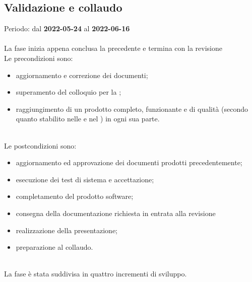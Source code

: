 \subsection{Validazione e collaudo}
Periodo: dal \textbf{2022-05-24} al \textbf{2022-06-16} \mbox{} \\ \mbox{} \\
La fase inizia appena conclusa la precedente e termina con la revisione \CA{} \\
Le precondizioni sono:
\begin{itemize}
 	\item aggiornamento e correzione dei documenti;
 	\item superamento del colloquio per la \PB{};
  	\item raggiungimento di un prodotto completo, funzionante e di qualità (secondo quanto stabilito nelle \NdP{} e nel \PdQ{} ) in ogni sua parte.
\end{itemize} \mbox{} \\
Le postcondizioni sono:
\begin{itemize}
	\item aggiornamento ed approvazione dei documenti prodotti precedentemente;
	\item esecuzione dei test di sistema e accettazione;
	\item completamento del prodotto software;
 	\item consegna della documentazione richiesta in entrata alla revisione \CA{}
	\item realizzazione della presentazione;
 	\item preparazione al collaudo.  
\end{itemize} \mbox{} \\
La fase è stata suddivisa in quattro incrementi di sviluppo.
\pagebreak

